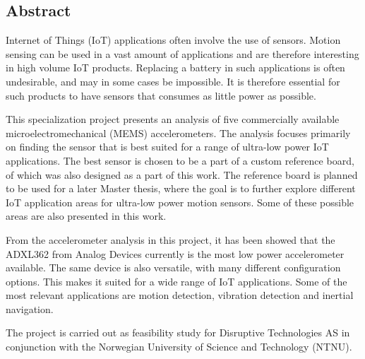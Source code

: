 \begin{center}
\section*{Abstract}
\end{center}

Internet of Things (IoT) applications often involve the use of sensors. Motion sensing can be used in a vast amount of applications and are therefore interesting in high volume IoT products. Replacing a battery in such applications is often undesirable, and may in some cases be impossible. It is therefore essential for such products to have sensors that consumes as little power as possible. 

This specialization project presents an analysis of five commercially available microelectromechanical (MEMS) accelerometers. The analysis focuses primarily on finding the sensor that is best suited for a range of ultra-low power IoT applications. The best sensor is chosen to be a part of a custom reference board, of which was also designed as a part of this work. The reference board is planned to be used for a later Master thesis, where the goal is to further explore different IoT application areas for ultra-low power motion sensors. Some of these possible areas are also presented in this work. 

From the accelerometer analysis in this project, it has been showed that the ADXL362 from Analog Devices currently is the most low power accelerometer available. The same device is also versatile, with many different configuration options. This makes it suited for a wide range of IoT applications. Some of the most relevant applications are motion detection, vibration detection and inertial navigation.  

The project is carried out as feasibility study for Disruptive Technologies AS in conjunction with the Norwegian University of Science and Technology (NTNU).